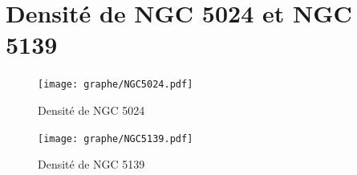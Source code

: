 %			
%			
\section{Densité de NGC 5024 et NGC 5139\label{Graphe-bofbof}}
	\begin{figure}[h]
		\centering \texttt{[image: graphe/NGC5024.pdf]}
		\caption{Densité de NGC 5024}
	\end{figure}

	\begin{figure}[h]
		\centering \texttt{[image: graphe/NGC5139.pdf]}
		\caption{Densité de NGC 5139}
	\end{figure}
	\FloatBarrier

%		
%	
%	

